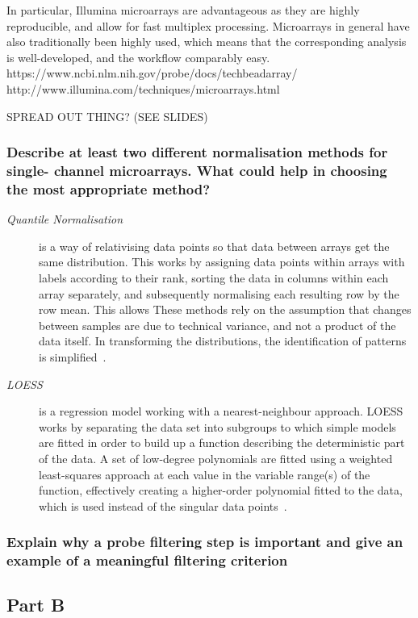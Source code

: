\documentclass[10pt]{article}\usepackage[]{graphicx}\usepackage[]{color}
\theoremstyle{plain}
\theoremstyle{definition}
\begin{document}
In particular, Illumina microarrays are advantageous as they are highly reproducible, and allow for fast multiplex processing. Microarrays in general have also traditionally been highly used, which means that the corresponding analysis is well-developed, and the workflow comparably easy.%
https://www.ncbi.nlm.nih.gov/probe/docs/techbeadarray/
http://www.illumina.com/techniques/microarrays.html

SPREAD OUT THING? (SEE SLIDES)


\subsubsection*{Describe at least two different normalisation methods for single-
channel microarrays. What could help in choosing the most
appropriate method?}
\begin{description}
\item[\emph{Quantile Normalisation}] is a way of relativising data points so that data between arrays get the same distribution. This works by assigning data points within arrays with labels according to their rank, sorting the data in columns within each array separately, and subsequently normalising each resulting row by the row mean. This allows 
These methods rely on the assumption that changes between samples are due to technical variance, and not a product of the data itself. In transforming the distributions, the identification of patterns is simplified~\cite{amaratunga2004exploration,Hicks}.

\item[\emph{LOESS}] is a regression model working with a nearest-neighbour approach. LOESS works by separating the data set into subgroups to which simple models are fitted in order to build up a function describing the deterministic part of the data. A set of low-degree polynomials are fitted using a weighted least-squares approach at each value in the variable range(s) of the function, effectively creating a higher-order polynomial fitted to the data, which is used instead of the singular data points~\cite{loess}.
\end{description}

\subsubsection*{Explain why a probe filtering step is important and give an
example of a meaningful filtering criterion}

\subsection*{Part B}
\end{document}
